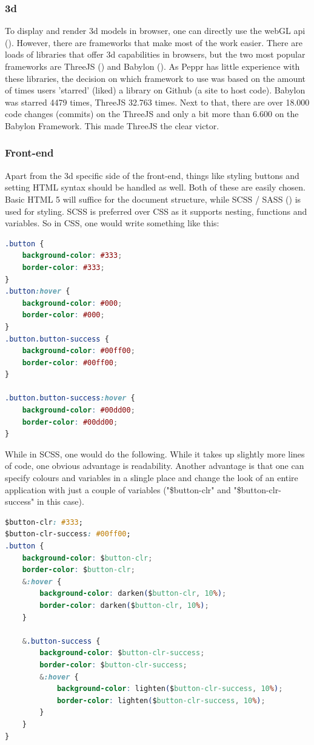 \subsubsection{3d}
\label{subsub: 3d}
To display and render 3d models in browser, one can directly use the webGL api (\cite{webGL}). However, there are frameworks that make most of the work easier. There are loads of libraries that offer 3d capabilities in browsers, but the two most popular frameworks are ThreeJS (\cite{threejs}) and Babylon (\cite{babylon}). As Peppr has little experience with these libraries, the decision on which framework to use was based on the amount of times users 'starred' (liked) a library on Github (a site to host code). Babylon was starred 4479 times, ThreeJS 32.763 times. Next to that, there are over 18.000 code changes (commits) on the ThreeJS and only a bit more than 6.600 on the Babylon Framework. This made ThreeJS the clear victor.

\subsubsection{Front-end}
\label{subsub: frontEnd}
Apart from the 3d specific side of the front-end, things like styling buttons and setting HTML syntax should be handled as well. Both of these are easily chosen. Basic HTML 5 will suffice for the document structure, while SCSS / SASS (\cite{scss}) is used for styling. SCSS is preferred over CSS as it supports nesting, functions and variables. So in CSS, one would write something like this:

\begin{lstlisting}[language=CSS]
.button {
	background-color: #333;
	border-color: #333;
}
.button:hover {
	background-color: #000;
	border-color: #000;
}
.button.button-success {
	background-color: #00ff00;
	border-color: #00ff00;
}

.button.button-success:hover {
	background-color: #00dd00;
	border-color: #00dd00;
}
\end{lstlisting}

\clearpage
While in SCSS, one would do the following. While it takes up slightly more lines of code, one obvious advantage is readability. Another advantage is that one can specify colours and variables in a slingle place and change the look of an entire application with just a couple of variables ("\$button-clr" and "\$button-clr-success" in this case).

\begin{lstlisting}[language=CSS]
$button-clr: #333;
$button-clr-success: #00ff00;
.button {
	background-color: $button-clr;
	border-color: $button-clr;
	&:hover {
		background-color: darken($button-clr, 10%);
		border-color: darken($button-clr, 10%);
	}
	
	&.button-success {
		background-color: $button-clr-success;
		border-color: $button-clr-success;
		&:hover {
			background-color: lighten($button-clr-success, 10%);
			border-color: lighten($button-clr-success, 10%);
		}
	}
}
\end{lstlisting}

